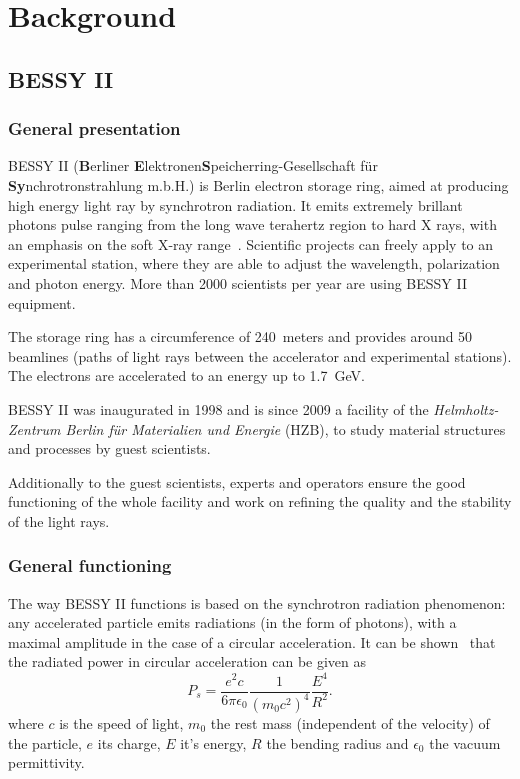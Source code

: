 
\chapter{Background}
\label{sec:background}

\section{BESSY II}

\subsection{General presentation}
BESSY II (\textbf{B}erliner \textbf{E}lektronen\-\textbf{S}peicherring-Gesellschaft für \textbf{Sy}n\-chro\-tron\-strahlung m.b.H.) is Berlin electron storage ring, aimed at producing high energy light ray by synchrotron radiation. It emits extremely brillant photons pulse ranging from the long wave terahertz region to hard X rays, with an emphasis on the soft X-ray range~\cite{web:bessy_homepage}. Scientific projects can freely apply to an experimental station, where they are able to adjust the wavelength, polarization and photon energy. More than 2000 scientists per year are using BESSY II equipment.

The storage ring has a circumference of 240~meters and provides around 50 beamlines (paths of light rays between the accelerator and experimental stations). The electrons are accelerated to an energy up to 1.7~GeV.

BESSY II was inaugurated in 1998 and is since 2009 a facility of the \textit{Helmholtz-Zentrum Berlin für Materialien und Energie} (HZB), to study material structures and processes by guest scientists.

Additionally to the guest scientists, experts and operators ensure the good functioning of the whole facility and work on refining the quality and the stability of the light rays. 

\subsection{General functioning}
The way BESSY II functions is based on the synchrotron radiation phenomenon: any accelerated particle emits radiations (in the form of photons), with a maximal amplitude in the case of a circular acceleration.  It can be shown~\cite{book:wille} that the radiated power in circular acceleration can be given as 
\begin{equation}
P_s = \frac{e^2 c}{6 \pi \epsilon_0}\frac{1}{(m_0 c^2)^4}\frac{E^4}{R^2}.
\end{equation}
where $c$ is the speed of light, $m_0$ the rest mass (independent of the velocity) of the particle, $e$ its charge, $E$ it's energy, $R$ the bending radius and $\epsilon_0$ the  vacuum permittivity.

